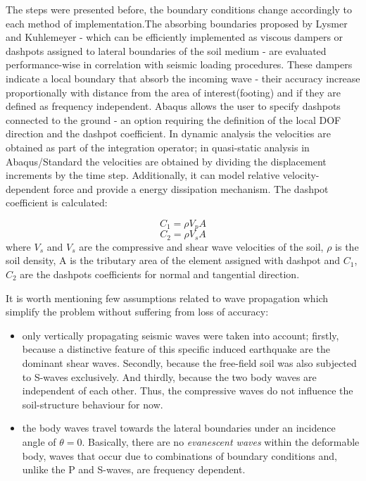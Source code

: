 \documentclass[10pt,a4paper]{report}
\begin{document}
	The steps were presented before, the boundary conditions change accordingly to each method of implementation.The absorbing boundaries proposed by Lysmer and Kuhlemeyer - which can be efficiently implemented as viscous dampers or dashpots assigned to lateral boundaries of the soil medium - are evaluated performance-wise in correlation with seismic loading procedures. These dampers indicate a local boundary that absorb the incoming wave - their accuracy increase proportionally with distance from the area of interest(footing) and if they are defined as frequency independent. Abaqus allows the user to specify dashpots connected to the ground - an option requiring the definition of the local DOF direction and the dashpot coefficient. In dynamic analysis the velocities are obtained as part of the integration operator; in quasi-static analysis in Abaqus/Standard the velocities are obtained by dividing the displacement increments by the time step. Additionally, it can model relative velocity-dependent force and provide a energy dissipation mechanism. The dashpot coefficient is calculated:
	
	\begin{equation}
		C_1=\rho V_p A
	\end{equation}
	\begin{equation}
		C_2=\rho V_s A
	\end{equation}
	where $V_s$ and $V_s$ are the compressive and shear wave velocities of the soil, $\rho$ is the soil density, A is the tributary area of the element assigned with dashpot and $C_1$, $C_2$ are the dashpots coefficients for normal and tangential direction.  
	
	It is worth mentioning few assumptions related to wave propagation which simplify the problem without suffering from loss of accuracy:
	\begin{itemize}
		\item only vertically propagating seismic waves were taken into account; firstly, because a distinctive feature of this specific induced earthquake are the dominant shear waves. Secondly, because the free-field soil was also subjected to S-waves exclusively. And thirdly, because the two body waves are independent of each other. Thus, the compressive waves do not influence the soil-structure behaviour for now.
		\item the body waves travel towards the lateral boundaries under an incidence angle of $\theta = 0$. Basically, there are no \textit{evanescent waves} within the deformable body, waves that occur due to combinations of boundary conditions and, unlike the P and S-waves, are frequency dependent.
	\end{itemize}
	
\end{document}
